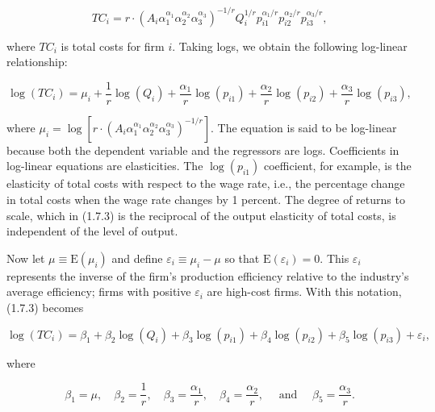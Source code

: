 \documentclass[10pt]{article}
\begin{document}
\begin{equation*}
T C_{i}=r \cdot\left(A_{i} \alpha_{1}^{\alpha_{1}} \alpha_{2}^{\alpha_{2}} \alpha_{3}^{\alpha_{3}}\right)^{-1 / r} Q_{i}^{1 / r} p_{i 1}^{\alpha_{1} / r} p_{i 2}^{\alpha_{2} / r} p_{i 3}^{\alpha_{3} / r}, \tag{1.7.2}
\end{equation*}


where $T C_{i}$ is total costs for firm $i$. Taking logs, we obtain the following log-linear relationship:


\begin{equation*}
\log \left(T C_{i}\right)=\mu_{i}+\frac{1}{r} \log \left(Q_{i}\right)+\frac{\alpha_{1}}{r} \log \left(p_{i 1}\right)+\frac{\alpha_{2}}{r} \log \left(p_{i 2}\right)+\frac{\alpha_{3}}{r} \log \left(p_{i 3}\right), \tag{1.7.3}
\end{equation*}


where $\mu_{i}=\log \left[r \cdot\left(A_{i} \alpha_{1}^{\alpha_{1}} \alpha_{2}^{\alpha_{2}} \alpha_{3}^{\alpha_{3}}\right)^{-1 / r}\right]$. The equation is said to be log-linear because both the dependent variable and the regressors are logs. Coefficients in log-linear equations are elasticities. The $\log \left(p_{i 1}\right)$ coefficient, for example, is the elasticity of total costs with respect to the wage rate, i.e., the percentage change in total costs when the wage rate changes by 1 percent. The degree of returns to scale, which in (1.7.3) is the reciprocal of the output elasticity of total costs, is independent of the level of output.

Now let $\mu \equiv \mathrm{E}\left(\mu_{i}\right)$ and define $\varepsilon_{i} \equiv \mu_{i}-\mu$ so that $\mathrm{E}\left(\varepsilon_{i}\right)=0$. This $\varepsilon_{i}$ represents the inverse of the firm's production efficiency relative to the industry's average efficiency; firms with positive $\varepsilon_{i}$ are high-cost firms. With this notation, (1.7.3) becomes


\begin{equation*}
\log \left(T C_{i}\right)=\beta_{1}+\beta_{2} \log \left(Q_{i}\right)+\beta_{3} \log \left(p_{i 1}\right)+\beta_{4} \log \left(p_{i 2}\right)+\beta_{5} \log \left(p_{i 3}\right)+\varepsilon_{i}, \tag{1.7.4}
\end{equation*}


where


\begin{equation*}
\beta_{1}=\mu, \quad \beta_{2}=\frac{1}{r}, \quad \beta_{3}=\frac{\alpha_{1}}{r}, \quad \beta_{4}=\frac{\alpha_{2}}{r}, \quad \text { and } \quad \beta_{5}=\frac{\alpha_{3}}{r} . \tag{1.7.5}
\end{equation*}
\end{document}
